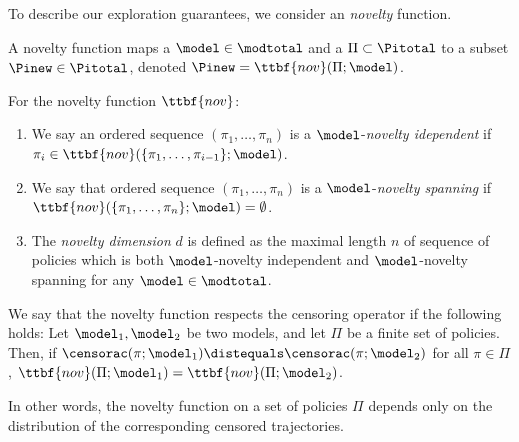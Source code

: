 \newcommand{\novel}{\ttbf{nov}}
 To describe our exploration guarantees, we consider an \emph{novelty} function. 
\begin{definition}
A novelty function maps a $\model \in \modtotal$ and a $\Pi \subset \Pitotal$ to a subset $\Pinew \in \Pitotal$, denoted $\Pinew = \novel(\Pi;\model)$. 
\end{definition}
\begin{definition} For the novelty function $\novel$:
\begin{enumerate}
	\item We say an ordered sequence $(\pi_1,\dots,\pi_n)$ is a $\model$-\emph{novelty idependent} if $\pi_i \in \novel(\{\pi_{1},\dots,\pi_{i-1}\}; \model)$.
	\item We say that ordered sequence $(\pi_1,\dots,\pi_n)$ is a $\model$-\emph{novelty spanning} if $\novel(\{\pi_1,\dots,\pi_n\};\model)= \emptyset$.
	\item The \emph{novelty dimension} $d$ is defined as the maximal length $n$ of sequence of policies which is both $\model$-novelty independent and $\model$-novelty spanning for any $\model \in \modtotal$. 
\end{enumerate}   
\end{definition}

\begin{definition} We say that the novelty function respects the censoring operator if the following holds: Let $\model_1,\model_2$ be two models, and let $\Pi$ be a finite set of policies. Then, if $\censorac(\pi;\model_1) \distequals \censorac(\pi;\model_2)$ for all $\pi \in \Pi$, $\novel(\Pi;\model_1) = \novel(\Pi;\model_2)$. 
\end{definition}
In other words, the novelty function on a set of policies $\Pi$ depends only on the distribution of the corresponding censored trajectories. 





